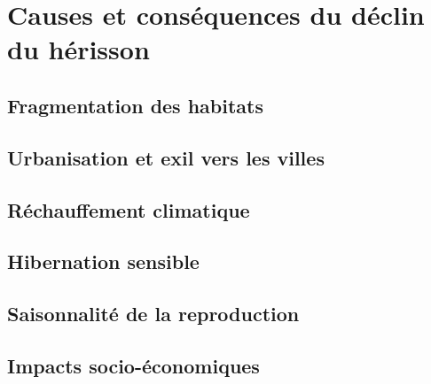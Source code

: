 \chapter{Causes et conséquences du déclin du hérisson}

\section{Fragmentation des habitats}

\section{Urbanisation et exil vers les villes}

\section{Réchauffement climatique}

\section{Hibernation sensible}

\section{Saisonnalité de la reproduction}

\section{Impacts socio-économiques}